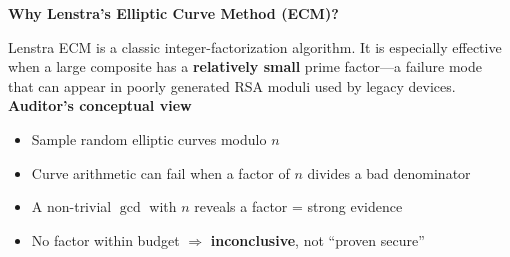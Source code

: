 \documentclass[12pt,landscape]{article}
\newcommand{\slidetitle}[1]{{\LARGE\bfseries\color{ink}#1}\par\vspace{2pt}{\color{cyan}\hrule height 1.4pt}\vspace{6pt}}
\newenvironment{slidepage}{%
  \noindent\begin{minipage}[t][\dimexpr\textheight-0.35cm\relax][s]{\textwidth}%
}{\end{minipage}\newpage}
\begin{document}
\begin{slidepage}
\begin{minipage}[t]{0.44\textwidth}
\begin{tikzpicture}[node distance=0.32cm]
\end{tikzpicture}
\vspace{\fill}
\end{minipage}
\vspace{\fill}
\end{slidepage}

\begin{slidepage}
\slidetitle{Why Lenstra's Elliptic Curve Method (ECM)?}
\begin{minipage}[t]{0.50\textwidth}
{\normalsize\color{body}Lenstra ECM is a classic integer-factorization algorithm. It is especially effective when a large composite has a \textbf{relatively small} prime factor---a failure mode that can appear in poorly generated RSA moduli used by legacy devices.}
\vspace{\fill}
{\large\bfseries\color{cyan}Auditor's conceptual view}
\begin{itemize}\normalsize
  \item Sample random elliptic curves modulo $n$
  \item Curve arithmetic can fail when a factor of $n$ divides a bad denominator
  \item A non-trivial $\gcd$ with $n$ reveals a factor = strong evidence
  \item No factor within budget $\Rightarrow$ \textbf{inconclusive}, not ``proven secure''
\end{itemize}
\vspace{\fill}
\end{minipage}\hfill
\begin{minipage}[t]{0.46\textwidth}

\end{minipage}
\end{slidepage}
\end{document}
